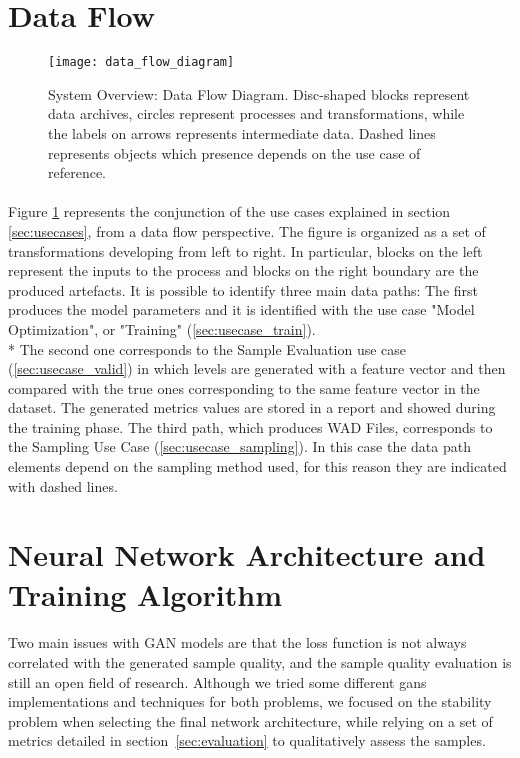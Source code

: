 \section{Data Flow}
\label{sec:dataflow}
\begin{figure}[h!]
	\begin{center}
		\texttt{[image: data\_flow\_diagram]}
	\end{center}
	
	\captionsetup{width=\linewidth}
	\caption[System Overview: Data Flow Diagram]{System Overview: Data Flow Diagram. Disc-shaped blocks represent data archives, circles represent processes and transformations, while the labels on arrows represents intermediate data. Dashed lines represents objects which presence depends on the use case of reference.}
	\label{fig:dataflow}
\end{figure}

\paragraph{} Figure \ref{fig:dataflow} represents the conjunction of the use cases explained in section \ref{sec:usecases}, from a data flow perspective.  The figure is organized as a set of transformations developing from left to right. In particular, blocks on the left represent the inputs to the process and blocks on the right boundary are the produced artefacts. 
It is possible to identify three main data paths: The first produces the model parameters and it is identified with the use case "Model Optimization", or "Training" (\ref{sec:usecase_train}). \\* The second one corresponds to the Sample Evaluation use case (\ref{sec:usecase_valid}) in which levels are generated with a feature vector and then compared with the true ones corresponding to the same feature vector in the dataset. The generated metrics values are stored in a report and showed during the training phase.
The third path, which produces WAD Files, corresponds to the Sampling Use Case (\ref{sec:usecase_sampling}). In this case the data path elements depend on the sampling method used, for this reason they are indicated with dashed lines.

\newpage

\section{Neural Network Architecture and Training Algorithm}
\label{sec:nn}
\paragraph{} Two main issues with GAN models are that the loss function is not always correlated with the generated sample quality, and the sample quality evaluation is still an open field of research. Although we tried some different \glspl{gan} implementations and techniques for both problems, we focused on the stability problem when selecting the final network architecture, while relying on a set of metrics detailed in section~\ref{sec:evaluation} to qualitatively assess the samples. 

